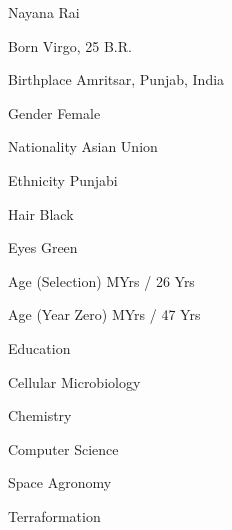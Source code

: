 

{
    \SetupCharacterTable

    \bTABLEbody

        \bTR 
            \bTD[nc=2] \midaligned{\rotate[rotation=42]{\color[red]{\bft Todo: Portrait will go here.}}} \eTD 
        \eTR

        \bTR 
            \bTD[nc=2] Nayana Rai \eTD 
        \eTR

        \bTR
            \bTC Born \eTC
             Virgo, 25 B.R. \eTC
        \eTR

        \bTR
            \bTC Birthplace \eTC
            \bTC Amritsar, Punjab, India \eTC
        \eTR
        
        \bTR
            \bTC Gender \eTC
            \bTC Female \eTC
        \eTR
            
        \bTR
            \bTC Nationality \eTC
            \bTC Asian Union \eTC
        \eTR
        
        \bTR
            \bTC Ethnicity \eTC
            \bTC Punjabi \eTC
        \eTR
        
        \bTR
          \bTC Hair \eTC
          \bTC Black \eTC
        \eTR
        
        \bTR
            \bTC Eyes \eTC
            \bTC Green \eTC
        \eTR

        \bTR
            \bTC Age (Selection) \eTC %
             MYrs / 26 Yrs \eTC %
        \eTR

        \bTR
            \bTC Age (Year Zero) \eTC
             MYrs / 47 Yrs \eTC
        \eTR

        \bTR
            \bTC Education \eTC
            \bTC 
                \startitemize[4]
                \startpacked
                \item Cellular Microbiology
                \item Chemistry
                \item Computer Science
                \item Space Agronomy
                \item Terraformation
                \stoppacked
                \stopitemize
            \eTC
        \eTR
        
}
